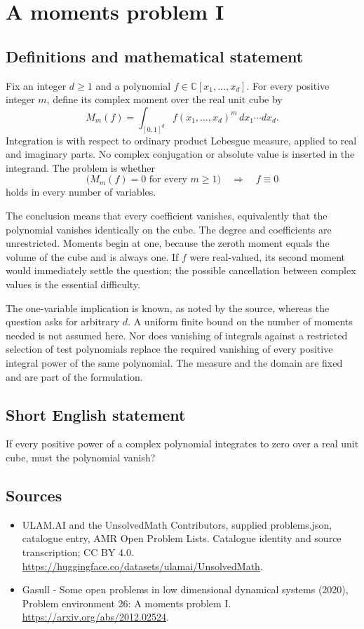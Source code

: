 \documentclass[11pt,a4paper]{article}
\begin{document}
\section*{A moments problem I}\label{statement}

\subsection{Definitions and mathematical statement}
Fix an integer $d\ge1$ and a polynomial
$f\in\mathbb C[x_1,\ldots,x_d]$. For every positive integer $m$, define
its complex moment over the real unit cube by
\[
 M_m(f)=\int_{[0,1]^d}f(x_1,\ldots,x_d)^m\,dx_1\cdots dx_d.
\]
Integration is with respect to ordinary product Lebesgue measure, applied
to real and imaginary parts. No complex conjugation or absolute value is
inserted in the integrand. The problem is whether
\[
 \bigl(M_m(f)=0\text{ for every }m\ge1\bigr)
       \quad\Longrightarrow\quad f\equiv0
\]
holds in every number of variables.

The conclusion means that every coefficient vanishes, equivalently that
the polynomial vanishes identically on the cube. The degree and coefficients
are unrestricted. Moments begin at one, because the zeroth moment equals
the volume of the cube and is always one. If $f$ were real-valued, its
second moment would immediately settle the question; the possible
cancellation between complex values is the essential difficulty.

The one-variable implication is known, as noted by the source, whereas
the question asks for arbitrary $d$. A uniform finite bound on the number
of moments needed is not assumed here. Nor does vanishing of integrals
against a restricted selection of test polynomials replace the required
vanishing of every positive integral power of the same polynomial. The
measure and the domain are fixed and are part of the formulation.
\subsection{Short English statement}
If every positive power of a complex polynomial integrates to zero over a real unit cube, must the polynomial vanish?
\subsection{Sources}
\begin{itemize}
\item[S1] ULAM.AI and the UnsolvedMath Contributors, supplied problems.json, catalogue entry, AMR Open Problem Lists. Catalogue identity and source transcription; CC BY 4.0.
\url{https://huggingface.co/datasets/ulamai/UnsolvedMath}.
\item[S2] Gasull - Some open problems in low dimensional dynamical systems (2020), Problem environment 26: A moments problem I. 
\url{https://arxiv.org/abs/2012.02524}.
\end{itemize}
\end{document}
